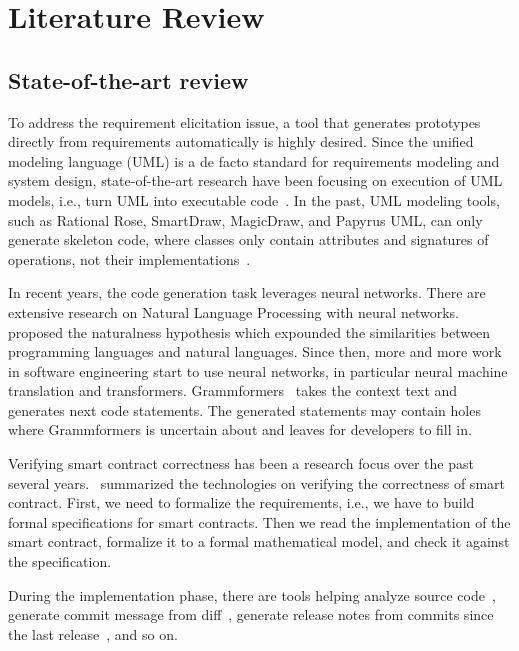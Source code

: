 \chapter{Literature Review}



\section{State-of-the-art review}

To address the requirement elicitation issue, a tool that generates prototypes directly from requirements automatically is highly desired.
Since the unified modeling language (UML) is a de facto standard for requirements modeling and system design,
state-of-the-art research have been focusing on execution of UML models, i.e., turn UML into executable code~\cite{ciccozzi2019execution}.
In the past, UML modeling tools, such as Rational Rose, SmartDraw, MagicDraw, and Papyrus UML, can only generate skeleton code, where classes only contain attributes and signatures of operations, not their implementations~\cite{regep2000using}.

In recent years, the code generation task leverages neural networks.
There are extensive research on Natural Language Processing with neural networks. ~\cite{allamanis2018survey} proposed the naturalness hypothesis which expounded the similarities between programming languages and natural languages. Since then, more and more work in software engineering start to use neural networks, in particular neural machine translation and transformers.
Grammformers~\cite{guo2021learning} takes the context text and generates next code statements. The generated statements may contain holes where Grammformers is uncertain about and leaves for developers to fill in.


Verifying smart contract correctness has been a research focus over the past several years.
\cite{tolmach2021survey}~summarized the technologies on verifying the correctness of smart contract.
First, we need to formalize the requirements, i.e., we have to build formal specifications for smart contracts.
Then we read the implementation of the smart contract, formalize it to a formal mathematical model, and check it against the specification.


During the implementation phase, there are tools helping analyze source code~\cite{morgachev2019detection,huo2016learning,gu2016deep},
generate commit message from diff~\cite{linares2015changescribe,buse2010automatically,huang2020learning},
generate release notes from commits since the last release~\cite{moreno2016arena}, and so on.


